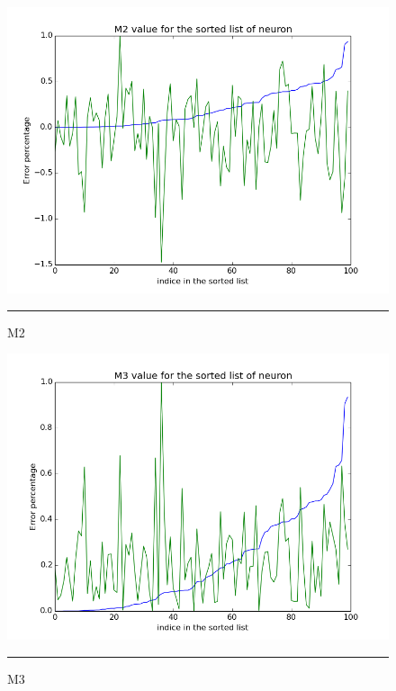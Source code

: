 \begin{figure}[!htb]
    \centering
    \includegraphics[scale=0.5]{Figures/m2.png}
    \rule{35em}{0.5pt}
    \caption[M2]{M2}
\label{fig:m2}
\end{figure}


\begin{figure}[!htb]
    \centering
    \includegraphics[scale=0.5]{Figures/m3.png}
    \rule{35em}{0.5pt}
    \caption[M3]{M3}
    \label{fig:m3}
\end{figure}



